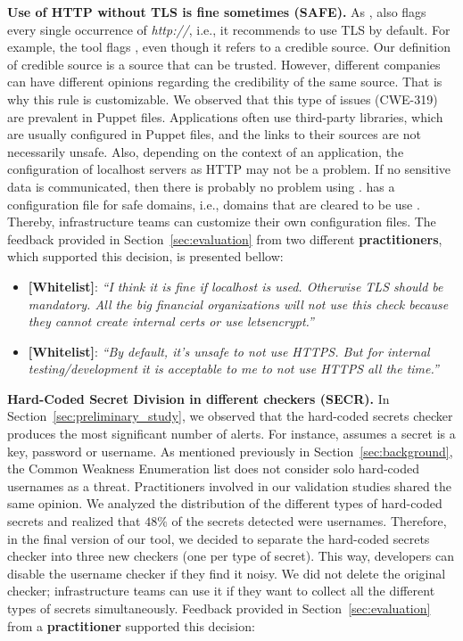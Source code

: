\textbf{Use of HTTP without TLS is fine sometimes (SAFE).} As \slic{}, \toolname{} also flags 
every single occurrence of \textit{http://}, i.e., it recommends to use TLS by default. For example, the tool
flags , even though it refers to a credible 
source. Our definition of credible source is a source that can be trusted. However, 
different companies can have different opinions regarding the credibility of the same source.
That is why this rule is customizable. We observed that this type of issues (CWE-319) are prevalent in Puppet files. 
Applications often use third-party libraries, which are usually configured in Puppet 
files, and the links to their sources are not necessarily unsafe.
Also, depending on the context of an application, the configuration of 
localhost servers as HTTP may not be a problem. If no sensitive data is communicated, 
then there is probably no problem using . \toolname{} has a configuration file 
for safe domains, i.e., domains that are cleared to be use . Thereby, infrastructure teams can 
customize their own configuration files. The feedback provided 
in Section~\ref{sec:evaluation} from two different \textbf{practitioners}, which
supported this decision, is presented bellow:

\begin{itemize}[topsep=.2ex,itemsep=.2ex,leftmargin=0em]
  \item[] \textbf{[Whitelist]}: 
  \textit{``I think it is fine if localhost is used. Otherwise TLS 
  should be mandatory. All the big 
  financial organizations will not use this check because 
  they cannot create internal certs or use 
  letsencrypt.''}
  \item[] \textbf{[Whitelist]}: 
  \textit{``By default, it's unsafe to not use HTTPS. 
  But for internal testing/development it is acceptable 
  to me to not use HTTPS all the time.''}
\end{itemize}


\textbf{Hard-Coded Secret Division in different checkers (SECR).} 
In Section~\ref{sec:preliminary_study},
we observed that the hard-coded secrets checker produces the most significant number
of alerts. For instance, \slic{} assumes a secret is a key, password or username. 
As mentioned previously in Section~\ref{sec:background},
the Common Weakness Enumeration list does not consider solo 
hard-coded usernames as a threat. Practitioners involved in our validation 
studies shared the same opinion. 
We analyzed the distribution of the different types of hard-coded secrets
and realized that $48\%$ of the secrets detected were usernames.
Therefore, in the final version of our tool, we decided
to separate the hard-coded secrets checker into three new checkers (one per type of secret). This 
way, developers can disable the username checker if they find it 
noisy. We did not delete the original checker; infrastructure
teams can use it if they want to collect all the different 
types of secrets simultaneously. Feedback provided 
in Section~\ref{sec:evaluation} from a \textbf{practitioner} 
supported this decision:

